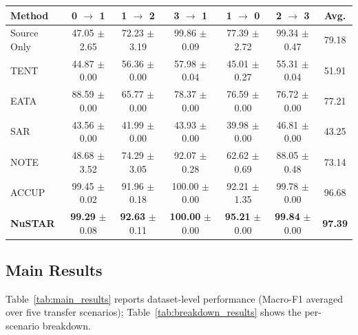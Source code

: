 \documentclass[sigconf, screen, review, anonymous]{acmart}
\theoremstyle{plain}
\theoremstyle{definition}
\theoremstyle{remark}
\begin{document}
\begin{table}[!t]
\begin{small}
\begin{sc}
{\begin{tabular}{l|ccccc|c}
					\midrule
					\textbf{Method} & \textbf{0 $\to$ 1} & \textbf{1 $\to$ 2} & \textbf{3 $\to$ 1} & \textbf{1 $\to$ 0} & \textbf{2 $\to$ 3} & \textbf{Avg.} \\
					\midrule
					Source Only & 47.05 \scriptsize{$\pm$2.65} & 72.23 \scriptsize{$\pm$3.19} & 99.86 \scriptsize{$\pm$0.09} & 77.39 \scriptsize{$\pm$2.72} & 99.34 \scriptsize{$\pm$0.47} & 79.18 \\
					TENT  & 44.87 \scriptsize{$\pm$0.00} & 56.36 \scriptsize{$\pm$0.00} & 57.98 \scriptsize{$\pm$0.04} & 45.01 \scriptsize{$\pm$0.27} & 55.31 \scriptsize{$\pm$0.04} & 51.91 \\
					EATA  & 88.59 \scriptsize{$\pm$0.00} & 65.77 \scriptsize{$\pm$0.00} & 78.37 \scriptsize{$\pm$0.00} & 76.59 \scriptsize{$\pm$0.00} & 76.72 \scriptsize{$\pm$0.00} & 77.21 \\
					SAR   & 43.56 \scriptsize{$\pm$0.00} & 41.99 \scriptsize{$\pm$0.00} & 43.93 \scriptsize{$\pm$0.00} & 39.98 \scriptsize{$\pm$0.00} & 46.81 \scriptsize{$\pm$0.00} & 43.25 \\
					NOTE  & 48.68 \scriptsize{$\pm$3.52} & 74.29 \scriptsize{$\pm$3.05} & 92.07 \scriptsize{$\pm$0.28} & 62.62 \scriptsize{$\pm$0.69} & 88.05 \scriptsize{$\pm$0.48} & 73.14 \\
					ACCUP & 99.45 \scriptsize{$\pm$0.02} & 91.96 \scriptsize{$\pm$0.18} & 100.00 \scriptsize{$\pm$0.00} & 92.21 \scriptsize{$\pm$1.35} & 99.78 \scriptsize{$\pm$0.00} & 96.68 \\
					\rowcolor{graybg}
					\textbf{NuSTAR} & \textbf{99.29} \scriptsize{$\pm$0.08} & \textbf{92.63} \scriptsize{$\pm$0.11} & \textbf{100.00} \scriptsize{$\pm$0.00} & \textbf{95.21} \scriptsize{$\pm$0.00} & \textbf{99.84} \scriptsize{$\pm$0.00} & \textbf{97.39} \\
					\bottomrule
				\end{tabular}
			}
		\end{sc}
	\end{small}
\end{table}



	\subsection{Main Results}
	\label{sec:main_results}

	Table~\ref{tab:main_results} reports dataset-level performance (Macro-F1 averaged over five transfer scenarios); Table~\ref{tab:breakdown_results} shows the per-scenario breakdown.
\end{document}
